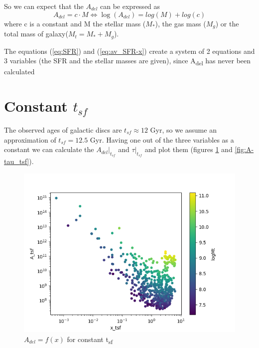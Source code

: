 \documentclass[a4paper,twocolumn]{article}
\begin{document}
So we can expect that the \(A_{del}\) can be expressed as
\begin{equation}\label{eq:A=f(M)}
A_{del}=c\cdot M \Leftrightarrow \log(A_{del})= log(M)+log(c)
\end{equation}
\noindent where c is a constant and M the stellar mass (\(M_*\)), the gas mass (\(M_g\)) or the total mass of galaxy(\(M_t = M_* + M_g\)).

The equations (\ref{eq:SFR}) and (\ref{eq:av_SFR-x}) create a system of 2 equations and 3 variables (the SFR and the stellar masses are given), since A\textsubscript{del} has never been calculated

\section{Constant \(t_{sf}\)}
\label{sec:orge82f914}

The observed ages of galactic discs are \(t_{sf}\approx 12\) Gyr\autocite{knoxSurveyCoolWhite1999}, so we assume an approximation of \(t_{sf}=12.5\) Gyr. Having one out of the three variables as a constant we can calculate the \(A_{del}|_{t_{sf}}\) and \(\tau|_{t_{sf}}\) and plot them (figures \ref{fig:A-x_tsf} and \ref{fig:A-tau_tsf}).

\begin{figure}[!htpb]
\centering
\includegraphics[width=.9\linewidth]{./figs/x-A_tsf.png}
\caption{\label{fig:A-x_tsf}\(A_{del} = f(x)\) for constant t\textsubscript{sf}}
\end{figure}
\end{document}

